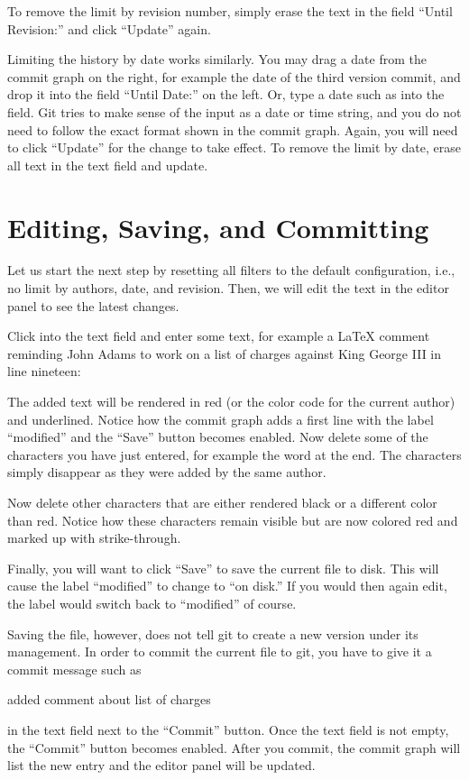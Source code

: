 To remove the limit by revision number, simply erase the text in the field ``Until Revision:'' and click ``Update'' again.

Limiting the history by date works similarly.  You may drag a date from the commit graph on the right, for example the date of the third version commit, and drop it into the field ``Until Date:'' on the left.  Or, type a date such as  into the field.  Git tries to make sense of the input as a date or time string, and you do not need to follow the exact format shown in the commit graph.  Again, you will need to click ``Update'' for the change to take effect.  To remove the limit by date, erase all text in the text field and update.

\section{Editing, Saving, and Committing}

Let us start the next step by resetting all filters to the default configuration, i.e., no limit by authors, date, and revision.  Then, we will edit the text in the editor panel to see the latest changes.

Click into the text field and enter some text, for example a LaTeX comment reminding John Adams to work on a list of charges against King George III in line nineteen:
\begin{CodeVerbatim}
\end{CodeVerbatim}
The added text will be rendered in red (or the color code for the current author) and underlined.  Notice how the commit graph adds a first line with the label ``modified'' and the ``Save'' button becomes enabled.  Now delete some of the characters you have just entered, for example the word  at the end.  The characters simply disappear as they were added by the same author.

Now delete other characters that are either rendered black or a different color than red.  Notice how these characters remain visible but are now colored red and marked up with strike-through.

Finally, you will want to click ``Save'' to save the current file to disk.  This will cause the label ``modified'' to change to ``on disk.''  If you would then again edit, the label would switch back to ``modified'' of course.

Saving the file, however, does not tell git to create a new version under its management.  In order to commit the current file to git, you have to give it a commit message such as 
\begin{CodeVerbatim}
added comment about list of charges
\end{CodeVerbatim}
in the text field next to the ``Commit'' button.  Once the text field is not empty, the ``Commit'' button becomes enabled.  After you commit, the commit graph will list the new entry and the editor panel will be updated.  

